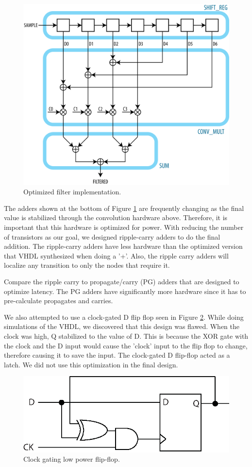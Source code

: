 \begin{figure}[ht]
\centering
\includegraphics[width=5in]{images/filter_filtered}
\caption{Optimized filter implementation.}
\label{fig:optimizedfilter}
\end{figure}

The adders shown at the bottom of Figure \ref{fig:optimizedfilter} are frequently changing as the final value is stabilized through the convolution hardware above.  Therefore, it is important that this hardware is optimized for power.  With reducing the number of transistors as our goal, we designed ripple-carry adders to do the final addition.  The ripple-carry adders have less hardware than the optimized version that VHDL synthesized when doing a '+'.  Also, the ripple carry adders will localize any transition to only the nodes that require it.

Compare the ripple carry to propagate/carry (PG) adders that are designed to optimize latency.  The PG adders have significantly more hardware since it has to pre-calculate propagates and carries.  

We also attempted to use a clock-gated D flip flop seen in Figure \ref{fig:gateclocked}.  While doing simulations of the VHDL, we discovered that this design was flawed.  When the clock was high, Q stabilized to the value of D.  This is because the XOR gate with the clock and the D input would cause the 'clock' input to the flip flop to change, therefore causing it to save the input.  The clock-gated D flip-flop acted as a latch.  We did not use this optimization in the final design.


\begin{figure}[ht]
\centering
\includegraphics[width=5in]{images/clockgating}
\caption{Clock gating low power flip-flop.}
\label{fig:gateclocked}
\end{figure}



